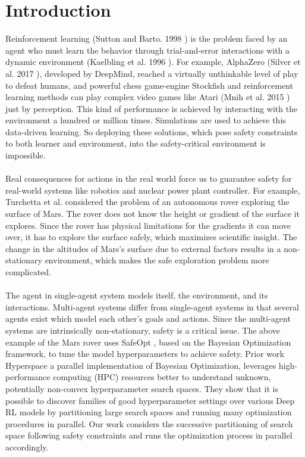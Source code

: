 \chapter{Introduction}\label{ch:introduction}
Reinforcement learning (Sutton and Barto. 1998 \cite{Sutton1998}) is the problem faced by an agent who must learn the behavior through trial-and-error interactions with a dynamic environment (Kaelbling et al. 1996 \cite{Littman1996}).
For example, AlphaZero (Silver et al. 2017 \cite{silver2017mastering}), developed by DeepMind, reached a virtually unthinkable level of play to defeat humans, and powerful chess game-engine Stockfish and reinforcement learning methods can play complex video games like Atari (Mnih et al. 2015 \cite{mnih2015humanlevel}) just by perception. 
This kind of performance is achieved by interacting with the environment a hundred or million times. 
Simulations are used to achieve this data-driven learning. 
So deploying these solutions, which pose safety constraints to both learner and environment, into the safety-critical environment is impossible.\\
\\
Real consequences for actions in the real world force us to guarantee safety for real-world systems like robotics and nuclear power plant controller. 
For example, Turchetta et al.\cite{TurchettaB016} considered the problem of an autonomous rover exploring the surface of Mars. 
The rover does not know the height or gradient of the surface it explores. 
Since the rover has physical limitations for the gradients it can move over, it has to explore the surface safely, which maximizes scientific insight. 
The change in the altitudes of Mars's surface due to external factors results in a non-stationary environment, which makes the safe exploration problem more complicated.\\
\\
The agent in single-agent system models itself, the environment, and its interactions. 
Multi-agent systems differ from single-agent systems in that several agents exist which model each other's goals and actions. 
Since the multi-agent systems are intrinsically non-stationary, safety is a critical issue. 
The above example of the Mars rover uses SafeOpt \cite{SuiGBK15}, based on the Bayesian Optimization framework, to tune the model hyperparameters to achieve safety. 
Prior work Hyperspace \cite{YoungHRK18} a parallel implementation of Bayesian Optimization, leverages high-performance computing (HPC) resources better to understand unknown, potentially non-convex hyperparameter search spaces. 
They show that it is possible to discover families of good hyperparameter settings over various Deep RL models by partitioning large search spaces and running many optimization procedures in parallel. 
Our work considers the successive partitioning of search space following safety constraints and runs the optimization process in parallel accordingly.

